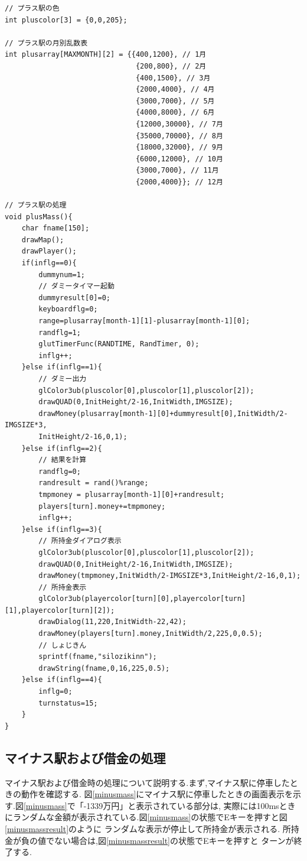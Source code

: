 \documentclass[a4j]{jarticle}
\begin{document}
    \begin{lstlisting}[basicstyle=\ttfamily\footnotesize, frame=single,label=plusMass,caption=plusMass関数]
// プラス駅の色
int pluscolor[3] = {0,0,205};

// プラス駅の月別乱数表
int plusarray[MAXMONTH][2] = {{400,1200}, // 1月
                               {200,800}, // 2月
                               {400,1500}, // 3月
                               {2000,4000}, // 4月
                               {3000,7000}, // 5月
                               {4000,8000}, // 6月
                               {12000,30000}, // 7月
                               {35000,70000}, // 8月
                               {18000,32000}, // 9月
                               {6000,12000}, // 10月
                               {3000,7000}, // 11月
                               {2000,4000}}; // 12月

// プラス駅の処理
void plusMass(){
    char fname[150];
    drawMap();
    drawPlayer(); 
    if(inflg==0){
        dummynum=1;
        // ダミータイマー起動
        dummyresult[0]=0;
        keyboardflg=0;
        range=plusarray[month-1][1]-plusarray[month-1][0];
        randflg=1;
        glutTimerFunc(RANDTIME, RandTimer, 0);
        inflg++;            
    }else if(inflg==1){
        // ダミー出力
        glColor3ub(pluscolor[0],pluscolor[1],pluscolor[2]);
        drawQUAD(0,InitHeight/2-16,InitWidth,IMGSIZE);
        drawMoney(plusarray[month-1][0]+dummyresult[0],InitWidth/2-IMGSIZE*3,
        InitHeight/2-16,0,1);            
    }else if(inflg==2){
        // 結果を計算
        randflg=0;
        randresult = rand()%range;
        tmpmoney = plusarray[month-1][0]+randresult;
        players[turn].money+=tmpmoney;
        inflg++;
    }else if(inflg==3){
        // 所持金ダイアログ表示
        glColor3ub(pluscolor[0],pluscolor[1],pluscolor[2]);
        drawQUAD(0,InitHeight/2-16,InitWidth,IMGSIZE);
        drawMoney(tmpmoney,InitWidth/2-IMGSIZE*3,InitHeight/2-16,0,1);
        // 所持金表示
        glColor3ub(playercolor[turn][0],playercolor[turn][1],playercolor[turn][2]);
        drawDialog(11,220,InitWidth-22,42);
        drawMoney(players[turn].money,InitWidth/2,225,0,0.5);
        // しょじきん
        sprintf(fname,"silozikinn");
        drawString(fname,0,16,225,0.5);               
    }else if(inflg==4){
        inflg=0;
        turnstatus=15;
    }
}
    \end{lstlisting}

    \subsection{マイナス駅および借金の処理}
    マイナス駅および借金時の処理について説明する.まず,マイナス駅に停車したときの動作を確認する.
    図\ref{minusmass}にマイナス駅に停車したときの画面表示を示す.図\ref{minusmass}で「-1339万円」と表示されている部分は,
    実際には100msときにランダムな金額が表示されている.図\ref{minusmass}の状態でEキーを押すと図\ref{minusmassresult}のように
    ランダムな表示が停止して所持金が表示される. 所持金が負の値でない場合は,図\ref{minusmassresult}の状態でEキーを押すと
    ターンが終了する.
\end{document}
